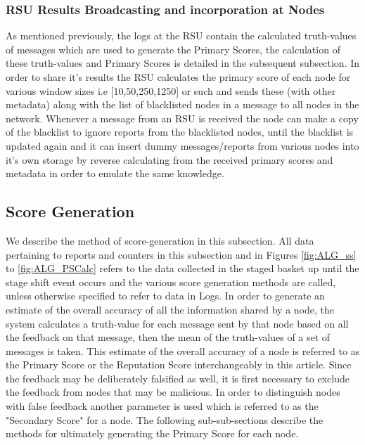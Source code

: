 \documentclass[journal]{IEEEtran}
\begin{document}
\subsubsection{RSU Results Broadcasting and incorporation at Nodes}
As mentioned previously, the logs at the RSU contain the calculated truth-values of messages which are used to generate the Primary Scores, the calculation of these truth-values and Primary Scores is detailed in the subsequent subsection.
In order to share it's results the RSU calculates the primary score of each node for various window sizes i.e [10,50,250,1250] or such and sends these (with other metadata) along with the list of blacklisted nodes in a message to all nodes in the network. Whenever a message from an RSU is received the node can make a copy of the blacklist to ignore reports from the blacklisted nodes, until the blacklist is updated again and it can insert dummy messages/reports from various nodes into it's own storage by reverse calculating from the received primary scores and metadata in order to emulate the same knowledge.
\subsection{Score Generation}
\label{sec:PM:ScoreGeneretion}
We describe the method of score-generation in this subsection. All data pertaining to reports and counters in this subsection and in Figures \ref{fig:ALG_ss} to \ref{fig:ALG_PSCalc} refers to the data collected in the staged basket up until the stage shift event occurs and the various score generation methods are called, unless otherwise specified to refer to data in Logs. 
In order to generate an estimate of the overall accuracy of all the information shared by a node, the system calculates a truth-value for each message sent by that node based on all the feedback on that message, then the mean of the truth-values of a set of messages is taken. This estimate of the overall accuracy of a node is referred to as the Primary Score or the Reputation Score interchangeably in this article. Since the feedback may be deliberately falsified as well, it is first necessary to exclude the feedback from nodes that may be malicious. In order to distinguish nodes with false feedback another parameter is used which is referred to as the "Secondary Score" for a node.
The following sub-sub-sections describe the methods for ultimately generating the Primary Score for each node.
\end{document}
